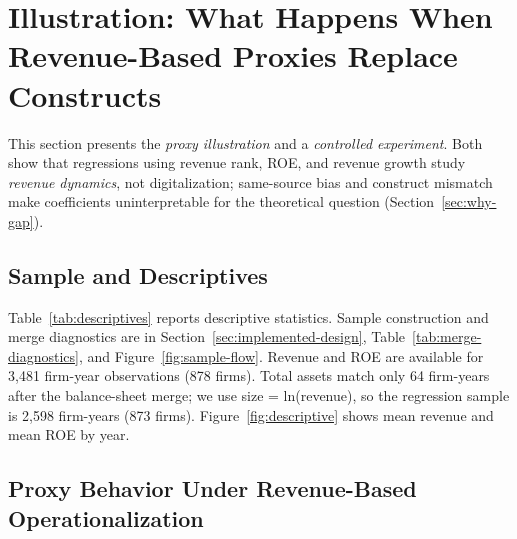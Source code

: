 
\section{Illustration: What Happens When Revenue-Based Proxies Replace Constructs}
\label{sec:results}

This section presents the \emph{proxy illustration} and a \emph{controlled experiment}. Both show that regressions using revenue rank, ROE, and revenue growth study \emph{revenue dynamics}, not digitalization; same-source bias and construct mismatch make coefficients uninterpretable for the theoretical question (Section~\ref{sec:why-gap}).

\subsection{Sample and Descriptives}

Table~\ref{tab:descriptives} reports descriptive statistics. Sample construction and merge diagnostics are in Section~\ref{sec:implemented-design}, Table~\ref{tab:merge-diagnostics}, and Figure~\ref{fig:sample-flow}. Revenue and ROE are available for 3,481 firm-year observations (878 firms). Total assets match only 64 firm-years after the balance-sheet merge; we use size = ln(revenue), so the regression sample is 2,598 firm-years (873 firms). Figure~\ref{fig:descriptive} shows mean revenue and mean ROE by year.

\subsection{Proxy Behavior Under Revenue-Based Operationalization}

